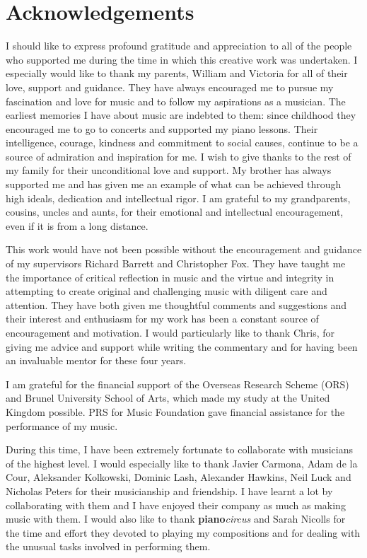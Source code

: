 \chapter*{Acknowledgements}

I should like to express profound gratitude and appreciation to all of the people who supported me during the time in which this creative work was undertaken. I especially would like to thank my parents, William and Victoria for all of their love, support and guidance. They have always encouraged me to pursue my fascination and love for music and to follow my aspirations as a musician. The earliest memories I have about music are indebted to them: since childhood they encouraged me to go to concerts and supported my piano lessons. Their intelligence, courage, kindness and commitment to social causes, continue to be a source of admiration and inspiration for me. I wish to give thanks to the rest of my family for their unconditional love and support. My brother has always supported me and has given me an example of what can be achieved through high ideals, dedication and intellectual rigor. I am grateful to my grandparents, cousins, uncles and aunts, for their emotional and intellectual encouragement, even if it is from a long distance.

This work would have not been possible without the encouragement and guidance of my supervisors Richard Barrett and Christopher Fox. They have taught me the importance of  critical reflection in music and the virtue and integrity in attempting to create original and challenging music with diligent care and attention. They have both given me thoughtful comments and suggestions and their interest and enthusiasm for my work has been a constant source of encouragement and motivation. I would particularly like to thank Chris, for giving me advice and support while writing the commentary and for having been an invaluable mentor for these four years.

I am grateful for the financial support of the Overseas Research Scheme (ORS) and Brunel University School of Arts, which made my study at the United Kingdom possible. PRS for Music Foundation gave financial assistance for the performance of my music.

During this time, I have been extremely fortunate to collaborate with musicians of the highest level. I would especially like to thank Javier Carmona, Adam de la Cour, Aleksander Kolkowski, Dominic Lash, Alexander Hawkins, Neil Luck and Nicholas Peters for their musicianship and friendship. I have learnt a lot by collaborating with them and I have enjoyed their company as much as making music with them. I would also like to thank \textbf{piano}\emph{circus} and Sarah Nicolls for the time and effort they devoted to playing my compositions and for dealing with the unusual tasks involved in performing them.
 
